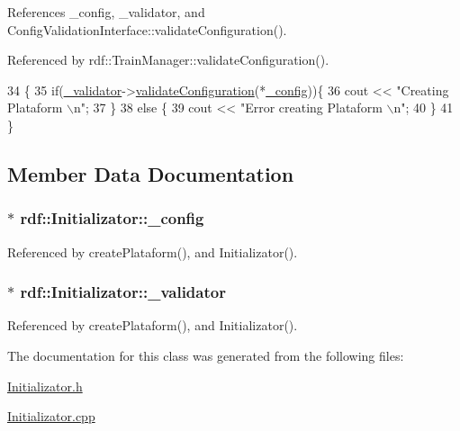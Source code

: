 References \+\_\+config, \+\_\+validator, and Config\+Validation\+Interface\+::validate\+Configuration().



Referenced by rdf\+::\+Train\+Manager\+::validate\+Configuration().


\begin{DoxyCode}
34                                       \{
35     \textcolor{keywordflow}{if}(\hyperlink{classrdf_1_1Initializator_a961484bb3a4e149498fd093e395de9e4}{\_validator}->\hyperlink{classConfigValidationInterface_a9f500c653a7b4b4559f920d499d7b96d}{validateConfiguration}(*\hyperlink{classrdf_1_1Initializator_a5294154934886ac4dd76c4f808781cad}{\_config}))\{
36         cout << \textcolor{stringliteral}{"Creating Plataform \(\backslash\)n"};
37     \}
38     \textcolor{keywordflow}{else} \{
39         cout << \textcolor{stringliteral}{"Error creating Plataform \(\backslash\)n"};
40     \}
41 \}
\end{DoxyCode}


\subsection{Member Data Documentation}
\subsubsection[{\texorpdfstring{\+\_\+config}{_config}}]{$\ast$ rdf\+::\+Initializator\+::\+\_\+config\hspace{0.3cm}{\ttfamily [private]}}\hypertarget{classrdf_1_1Initializator_a5294154934886ac4dd76c4f808781cad}{}\label{classrdf_1_1Initializator_a5294154934886ac4dd76c4f808781cad}


Referenced by create\+Plataform(), and Initializator().

\subsubsection[{\texorpdfstring{\+\_\+validator}{_validator}}]{$\ast$ rdf\+::\+Initializator\+::\+\_\+validator\hspace{0.3cm}{\ttfamily [private]}}\hypertarget{classrdf_1_1Initializator_a961484bb3a4e149498fd093e395de9e4}{}\label{classrdf_1_1Initializator_a961484bb3a4e149498fd093e395de9e4}


Referenced by create\+Plataform(), and Initializator().



The documentation for this class was generated from the following files\+:\begin{DoxyCompactItemize}
\item 
\hyperlink{Initializator_8h}{Initializator.\+h}\item 
\hyperlink{Initializator_8cpp}{Initializator.\+cpp}\end{DoxyCompactItemize}
